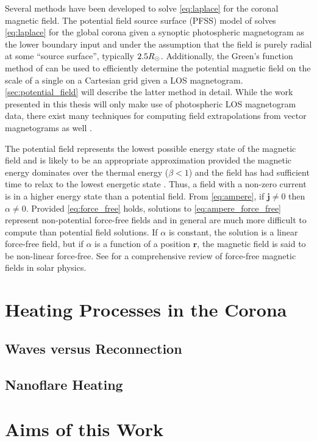 Several methods have been developed to solve \autoref{eq:laplace} for the coronal magnetic field. The potential field source surface (PFSS) model of \citet{schatten_model_1969} solves \autoref{eq:laplace} for the global corona given a synoptic photospheric magnetogram as the lower boundary input and under the assumption that the field is purely radial at some ``source surface'', typically $2.5R_{\odot}$. Additionally, the Green's function method of \citet{schmidt_observable_1964} can be used to efficiently determine the potential magnetic field on the scale of a single \AR{} on a Cartesian grid given a LOS magnetogram. \autoref{sec:potential_field} will describe the latter method in detail. While the work presented in this thesis will only make use of photospheric LOS magnetogram data, there exist many techniques for computing field extrapolations from vector magnetograms as well \citep[see review by][]{welsch_deriving_2016}.

The potential field represents the lowest possible energy state of the magnetic field and is likely to be an appropriate approximation provided the magnetic energy dominates over the thermal energy ($\beta<1$) and the field has had sufficient time to relax to the lowest energetic state \citep{priest_magnetohydrodynamics_2014}. Thus, a field with a non-zero current is in a higher energy state than a potential field. From \autoref{eq:ampere}, if $\mathbf{j}\neq0$ then $\alpha\neq0$. Provided \autoref{eq:force_free} holds, solutions to \autoref{eq:ampere_force_free} represent non-potential force-free fields and in general are much more difficult to compute than potential field solutions. If $\alpha$ is constant, the solution is a linear force-free field, but if $\alpha$ is a function of a position $\mathbf{r}$, the magnetic field is said to be non-linear force-free. See \citet{wiegelmann_solar_2012} for a comprehensive review of force-free magnetic fields in solar physics. 

\section{Heating Processes in the Corona}

\subsection{Waves versus Reconnection}

\subsection{Nanoflare Heating}

\section{Aims of this Work}

